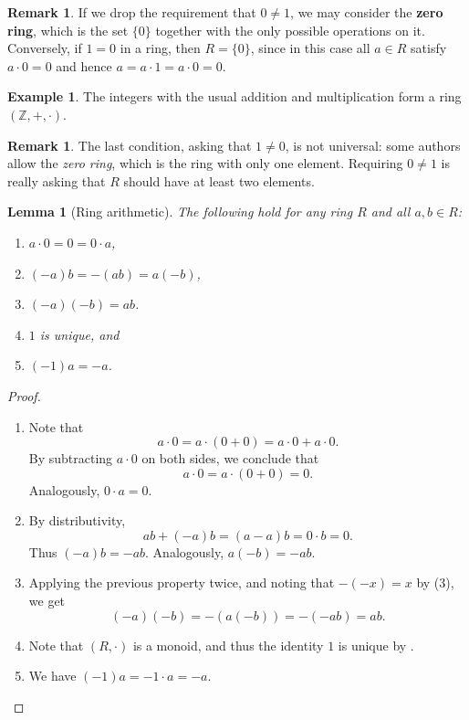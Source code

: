 \documentclass[12pt]{report}
\newtheorem{lemma}[theorem]{Lemma}
\numberwithin{equation}{section}
\numberwithin{theorem}{chapter}
\theoremstyle{definition}
\newtheorem{example}[theorem]{Example}
\newtheorem*{basic properties}{Basic Properties}
\newtheorem*{Important Remark}{Important Remark}
\newtheorem{remark}[theorem]{Remark}
\newcommand{\df}[1]{{\bf #1}\index{#1}}
\newcommand{\Z}{\mathbb{Z}}
\begin{document}
\begin{remark}
If we drop the requirement that $0 \neq 1$, we may consider the \df{zero ring}, which is the set $\{ 0 \}$ together with the only possible operations on it.
	Conversely, if $1 = 0$ in a ring, then $R = \{0\}$, since in this case all $a \in R$ satisfy $a \cdot 0 = 0$ and hence $a = a \cdot 1 = a \cdot 0 = 0$.
\end{remark}


\begin{example}
	The integers with the usual addition and multiplication form a ring $(\Z,+,\cdot)$.
\end{example}
 
\begin{remark}
	The last condition, asking that $1 \neq 0$, is not universal: some authors allow the \emph{zero ring}, which is the ring with only one element. Requiring $0 \neq 1$ is really asking that $R$ should have at least two elements.
\end{remark}

 
 
\begin{lemma}[Ring arithmetic] 
The following hold for any ring $R$ and all $a,b \in R$:
\begin{enumerate}[itemsep=0.1mm]
\item $a \cdot 0 = 0 = 0 \cdot a$,
\item $(-a)b = -(ab) = a(-b)$,
\item $(-a)(-b) = ab$.
\item $1$ is unique, and
\item $(-1)a = -a$.
\end{enumerate}
\end{lemma}


\begin{proof}
	\begin{enumerate}[itemsep=0.1mm]
	\item Note that
	$$a \cdot 0 = a \cdot (0+0) = a \cdot 0 + a \cdot 0.$$
	By subtracting $a \cdot 0$ on both sides, we conclude that
	$$a \cdot 0 = a \cdot (0+0) = 0.$$
	Analogously, $0 \cdot a = 0$.
	\item By distributivity,
	$$ab + (-a)b = (a-a)b = 0 \cdot b = 0.$$
	Thus $(-a)b = -ab$. Analogously, $a(-b) = -ab$.
	\item Applying the previous property twice, and noting that $-(-x)=x$ by  (3), we get
	$$(-a)(-b) = -(a(-b)) = -(-ab) = ab.$$
	\item Note that $(R, \cdot)$ is a monoid, and thus the identity $1$ is unique by .
	\item We have $(-1)a = - 1 \cdot a = -a$.\qedhere
	\end{enumerate}
\end{proof}
\end{document}

